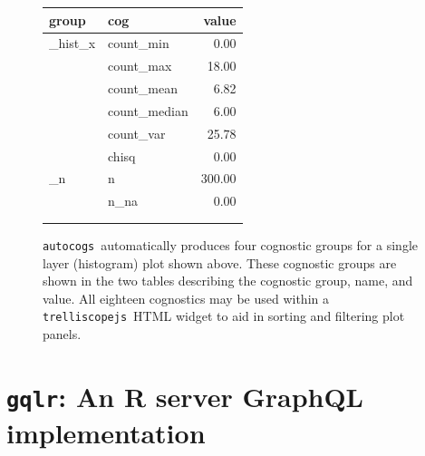 \documentclass[stat,dissertation]{puthesis}\usepackage[]{graphicx}\usepackage{xcolor}
\newcommand{\pkg}[1]{\texttt{#1}}
\newcommand{\trelliscopejs}{\pkg{trelliscopejs}}
\newcommand{\autocogs}{\pkg{autocogs}}
\newcommand{\gqlr}{\pkg{gqlr}}
\begin{document}
\begin{figure}[H]
{%
\begin{tabular}{llr}
  \toprule
 \textnormal{group} & \textnormal{cog} & \textnormal{value} \\ 
  \midrule
   \_hist\_x & count\_min & 0.00 \\ 
    & count\_max & 18.00 \\ 
    & count\_mean & 6.82 \\ 
    & count\_median & 6.00 \\ 
    & count\_var & 25.78 \\ 
  \bigskip  & chisq & 0.00 \\ 
   \_n & n & 300.00 \\ 
    & n\_na & 0.00 \\ 
    &  &  \\ 
    &  &  \\ 
   \bottomrule
\end{tabular}
  }
\caption[\autocogs~automatically produces four cognostic groups for a single layer (histogram) plot]{\autocogs~automatically produces four cognostic groups for a single layer (histogram) plot shown above. These cognostic groups are shown in the two tables describing the cognostic group, name, and value.  All eighteen cognostics may be used within a \trelliscopejs~HTML widget to aid in sorting and filtering plot panels.}
\end{figure}
\renewcommand{\arraystretch}{1} %





\section{\gqlr: An R server GraphQL implementation}
\end{document}

